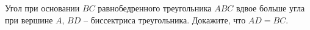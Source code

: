 \begin{ex}
	\begin{condition}
		Угол при основании \( BC  \) равнобедренного треугольника \( ABC \) вдвое больше угла при вершине \( A \), \( BD \) – биссектриса треугольника. Докажите, что \( AD = BC \).
	\end{condition}
\end{ex}